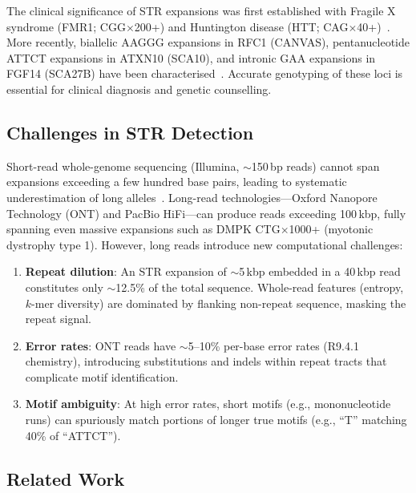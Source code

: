 \documentclass[11pt,twocolumn]{article}
\begin{document}
The clinical significance of STR expansions was first established with
Fragile X syndrome (FMR1; CGG$\times$200+) and Huntington disease
(HTT; CAG$\times$40+)~\citep{fu1991,macdonald1993}.  More recently,
biallelic AAGGG expansions in RFC1 (CANVAS), pentanucleotide ATTCT
expansions in ATXN10 (SCA10), and intronic GAA expansions in FGF14
(SCA27B) have been characterised~\citep{cortese2019,matsuura2000,pellerin2023}.
Accurate genotyping of these loci is essential for clinical diagnosis
and genetic counselling.

\subsection{Challenges in STR Detection}

Short-read whole-genome sequencing (Illumina, $\sim$150\,bp reads) cannot
span expansions exceeding a few hundred base pairs, leading to systematic
underestimation of long alleles~\citep{tankard2018}.  Long-read
technologies---Oxford Nanopore Technology (ONT) and PacBio HiFi---can
produce reads exceeding 100\,kbp, fully spanning even massive expansions
such as DMPK CTG$\times$1000+ (myotonic dystrophy type 1).  However,
long reads introduce new computational challenges:

\begin{enumerate}[nosep]
    \item \textbf{Repeat dilution}: An STR expansion of $\sim$5\,kbp
          embedded in a 40\,kbp read constitutes only $\sim$12.5\% of the
          total sequence.  Whole-read features (entropy, $k$-mer diversity)
          are dominated by flanking non-repeat sequence, masking the
          repeat signal.
    \item \textbf{Error rates}: ONT reads have $\sim$5--10\% per-base
          error rates (R9.4.1 chemistry), introducing substitutions and
          indels within repeat tracts that complicate motif identification.
    \item \textbf{Motif ambiguity}: At high error rates, short motifs
          (e.g., mononucleotide runs) can spuriously match portions
          of longer true motifs (e.g., ``T'' matching 40\% of ``ATTCT'').
\end{enumerate}

\subsection{Related Work}
\end{document}
